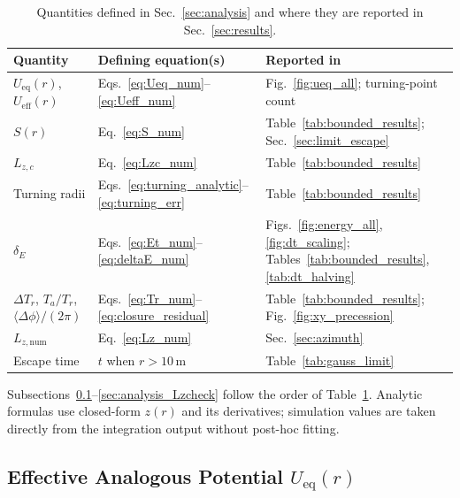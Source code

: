\documentclass[11pt,letterpaper]{article}
\begin{document}
\begin{table}[htbp]
    \centering
    \caption{Quantities defined in Sec.~\ref{sec:analysis} and where they are reported in Sec.~\ref{sec:results}.}
    \label{tab:analysis_map}
    \small
    \renewcommand{\arraystretch}{1.28}
    \setlength{\tabcolsep}{7pt}
    \begin{tabular}{@{}>{\raggedright\arraybackslash}p{3.2cm} >{\raggedright\arraybackslash}p{4.8cm} >{\raggedright\arraybackslash}p{4.6cm}@{}}
        \toprule
        Quantity & Defining equation(s) & Reported in \\
        \midrule
        $U_{\mathrm{eq}}(r)$, $U_{\mathrm{eff}}(r)$ & Eqs.~\eqref{eq:Ueq_num}--\eqref{eq:Ueff_num} & Fig.~\ref{fig:ueq_all}; turning-point count \\
        $S(r)$ & Eq.~\eqref{eq:S_num} & Table~\ref{tab:bounded_results}; Sec.~\ref{sec:limit_escape} \\
        $L_{z,c}$ & Eq.~\eqref{eq:Lzc_num} & Table~\ref{tab:bounded_results} \\
        Turning radii & Eqs.~\eqref{eq:turning_analytic}--\eqref{eq:turning_err} & Table~\ref{tab:bounded_results} \\
        $\delta_E$ & Eqs.~\eqref{eq:Et_num}--\eqref{eq:deltaE_num} & Figs.~\ref{fig:energy_all}, \ref{fig:dt_scaling}; Tables~\ref{tab:bounded_results}, \ref{tab:dt_halving} \\
        $\Delta T_r$, $T_a/T_r$, $\langle\Delta\phi\rangle/(2\pi)$ & Eqs.~\eqref{eq:Tr_num}--\eqref{eq:closure_residual} & Table~\ref{tab:bounded_results}; Fig.~\ref{fig:xy_precession} \\
        $L_{z,\mathrm{num}}$ & Eq.~\eqref{eq:Lz_num} & Sec.~\ref{sec:azimuth} \\
        Escape time & $t$ when $r>10\,\mathrm{m}$ & Table~\ref{tab:gauss_limit} \\
        \bottomrule
    \end{tabular}
\end{table}

Subsections~\ref{sec:analysis_Ueq}--\ref{sec:analysis_Lzcheck} follow the order of Table~\ref{tab:analysis_map}. Analytic formulas use closed-form $z(r)$ and its derivatives; simulation values are taken directly from the integration output without post-hoc fitting.

\subsection{Effective Analogous Potential $U_{\mathrm{eq}}(r)$}
\label{sec:analysis_Ueq}
\end{document}
